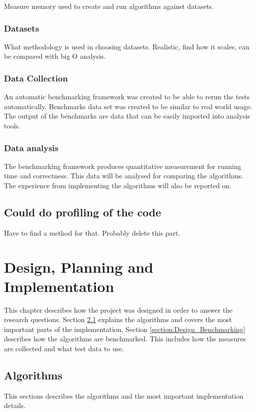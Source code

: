 \documentclass[11pt,twoside,a4paper]{report}
\begin{document}
Measure memory used to create and run algorithms against datasets.

\subsection{Datasets}
What methodology is used in choosing datasets. Realistic, find how it scales, can be compared with big O analysis.

\subsection{Data Collection}
An automatic benchmarking framework was created to be able to rerun the tests automatically. Benchmarks data set was created to be similar to real world usage. The output of the benchmarks are data that can be easily imported into analysis tools.

\subsection{Data analysis}
The benchmarking framework produces quantitative measurement for running time and correctness. This data will be analysed for comparing the algorithms. The experience from implementing the algorithms will also be reported on.

\section{Could do profiling of the code}
Have to find a method for that. Probably delete this part.


\chapter{Design, Planning and Implementation}
\label{chapter:Design}
This chapter describes how the project was designed in order to answer the research questions. Section \ref{section:Algorithms} explains the algorithms and covers the most important parts of the implementation. Section \ref{section:Design_Benchmarking} describes how the algorithms are benchmarked. This includes how the measures are collected and what test data to use.

\section{Algorithms}
\label{section:Algorithms}
This sections describes the algorithms and the most important implementation details. 
\end{document}
